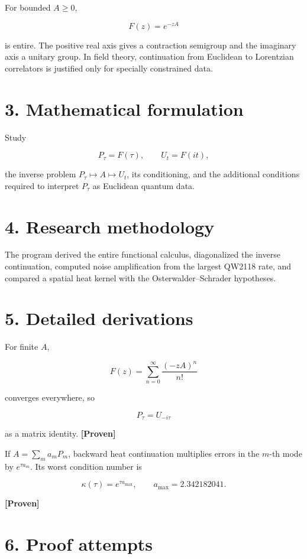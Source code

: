 \documentclass[11pt,a4paper,openany]{report}
\newcommand{\statusProven}{\textcolor{fingreen}{[Proven]}}
\begin{document}
For bounded \(A\ge0\),

\[
F(z)=e^{-zA}
\]

is entire. The positive real axis gives a contraction semigroup and the imaginary axis a unitary group. In field theory, continuation from Euclidean to Lorentzian correlators is justified only for specially constrained data.

\section{3. Mathematical formulation}

Study

\[
P_\tau=F(\tau),\qquad
U_t=F(it),
\]

the inverse problem \(P_\tau\mapsto A\mapsto U_t\), its conditioning, and the additional conditions required to interpret \(P_\tau\) as Euclidean quantum data.

\section{4. Research methodology}

The program derived the entire functional calculus, diagonalized the inverse continuation, computed noise amplification from the largest QW2118 rate, and compared a spatial heat kernel with the Osterwalder–Schrader hypotheses.

\section{5. Detailed derivations}

For finite \(A\),

\[
F(z)=\sum_{n=0}^\infty\frac{(-zA)^n}{n!}
\]

converges everywhere, so

\[
P_\tau=U_{-i\tau}
\]

as a matrix identity. \textbf{\statusProven{}}

If \(A=\sum_ma_mP_m\), backward heat continuation multiplies errors in the \(m\)-th mode by \(e^{\tau a_m}\). Its worst condition number is

\[
\kappa(\tau)=e^{\tau a_{\max}},
\qquad a_{\max}=2.342182041.
\]

\textbf{\statusProven{}}

\section{6. Proof attempts}
\end{document}
